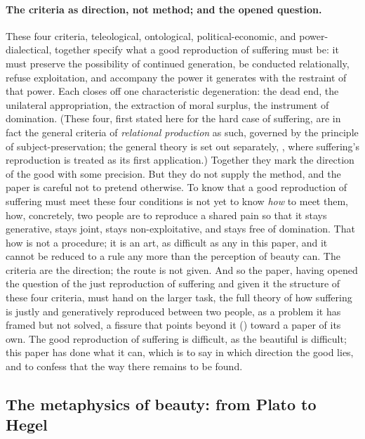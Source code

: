 \paragraph{The criteria as direction, not method; and the opened question.}
These four criteria, teleological, ontological, political-economic, and power-dialectical, together specify what a good reproduction of suffering must be: it must preserve the possibility of continued generation, be conducted relationally, refuse exploitation, and accompany the power it generates with the restraint of that power. Each closes off one characteristic degeneration: the dead end, the unilateral appropriation, the extraction of moral surplus, the instrument of domination. (These four, first stated here for the hard case of suffering, are in fact the general criteria of \emph{relational production} as such, governed by the principle of subject-preservation; the general theory is set out separately, , where suffering's reproduction is treated as its first application.) Together they mark the direction of the good with some precision. But they do not supply the method, and the paper is careful not to pretend otherwise. To know that a good reproduction of suffering must meet these four conditions is not yet to know \emph{how} to meet them, how, concretely, two people are to reproduce a shared pain so that it stays generative, stays joint, stays non-exploitative, and stays free of domination. That how is not a procedure; it is an art, as difficult as any in this paper, and it cannot be reduced to a rule any more than the perception of beauty can. The criteria are the direction; the route is not given. And so the paper, having opened the question of the just reproduction of suffering and given it the structure of these four criteria, must hand on the larger task, the full theory of how suffering is justly and generatively reproduced between two people, as a problem it has framed but not solved, a fissure that points beyond it () toward a paper of its own. The good reproduction of suffering is difficult, as the beautiful is difficult; this paper has done what it can, which is to say in which direction the good lies, and to confess that the way there remains to be found.

\subsection{The metaphysics of beauty: from Plato to Hegel}
\label{p21:sub:ap-metaphysics}

